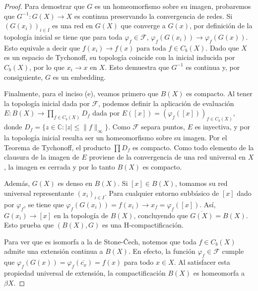 \documentclass{article}
\theoremstyle{plain}
\theoremstyle{definition}
\begin{document}
\begin{proof}
    Para demostrar que \( G \) es un homeomorfismo sobre su imagen, probaremos que \( G^{-1} : G(X) \to X \) es continua preservando la convergencia de redes. Si \( {(G(x_i))}_{i \in I} \) es una red en \( G(X) \) que converge a \( G(x) \), por definición de la topología inicial se tiene que para toda \( \varphi_f \in \mathcal{F} \), \( \varphi_f(G(x_i)) \longrightarrow \varphi_f(G(x)) \). Esto equivale a decir que \( f(x_i) \longrightarrow f(x) \) para toda \( f \in C_b(X) \). Dado que \( X \) es un espacio de Tychonoff, su topología coincide con la inicial inducida por \( C_b(X) \), por lo que \( x_i \longrightarrow x \) en \( X \). Esto demuestra que \( G^{-1} \) es continua y, por consiguiente, \( G \) es un embedding.

    Finalmente, para el inciso (e), veamos primero que \( B(X) \) es compacto. Al tener la topología inicial dada por \( \mathcal{F} \), podemos definir la aplicación de evaluación \( E: B(X) \to \prod_{f \in C_b(X)} D_f \) dada por \( E([x]) = {(\varphi_f([x]))}_{f \in C_b(X)} \), donde \( D_f = \{ z \in \mathbb{C} : |z| \leq \|f\|_\infty \} \). Como \( \mathcal{F} \) separa puntos, \( E \) es inyectiva, y por la topología inicial resulta ser un homeomorfismo sobre su imagen. Por el Teorema de Tychonoff, el producto \( \prod D_f \) es compacto. Como todo elemento de la clausura de la imagen de \( E \) proviene de la convergencia de una red universal en \( X \), la imagen es cerrada y por lo tanto \( B(X) \) es compacto.

    Además, \( G(X) \) es denso en \( B(X) \). Si \( [x] \in B(X) \), tomamos su red universal representante \( {(x_i)}_{i \in I} \). Para cualquier entorno subbásico de \( [x] \) dado por \( \varphi_f \), se tiene que \( \varphi_f(G(x_i)) = f(x_i) \longrightarrow x_f = \varphi_f([x]) \). Así, \( G(x_i) \longrightarrow [x] \) en la topología de \( B(X) \), concluyendo que \( \overline{G(X)} = B(X) \). Esto prueba que \( (B(X), G) \) es una H-compactificación.

    Para ver que es isomorfa a la de Stone-Čech, notemos que toda \( f \in C_b(X) \) admite una extensión continua a \( B(X) \). En efecto, la función \( \varphi_f \in \mathcal{F} \) cumple que \( \varphi_f(G(x)) = \varphi_f(\overline{c_x}) = f(x) \) para todo \( x \in X \). Al satisfacer esta propiedad universal de extensión, la compactificación \( B(X) \) es homeomorfa a \( \beta X \).
\end{proof}
\end{document}
